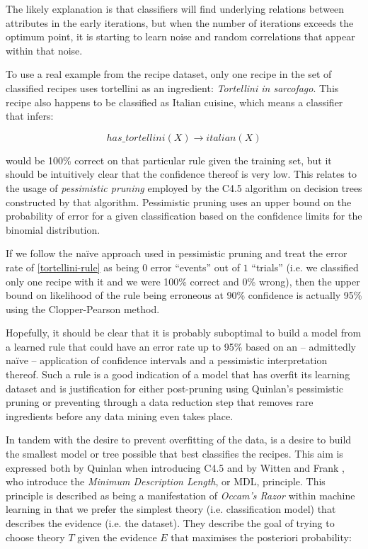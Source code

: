 \documentclass[11pt,a4paper]{article}
\begin{document}
The likely explanation \cite{tetko1995neural} is that classifiers will find underlying
relations between attributes in the early iterations, but when the number of iterations
exceeds the optimum point, it is starting to learn noise and random correlations that
appear within that noise.

To use a real example from the recipe dataset, only one recipe in the set of
classified recipes uses tortellini as an ingredient: \emph{Tortellini in sarcofago}.
This recipe also happens to be classified as Italian cuisine, which means a classifier
that infers:

\begin{equation} \label{tortellini-rule}
has\_tortellini(X) \to italian(X)
\end{equation}

\noindent would be 100\% correct on that particular
rule given the training set, but it should be intuitively clear that the confidence
thereof is very low. This relates to the usage of \emph{pessimistic pruning} employed
by the C4.5 algorithm \cite{quinlan1993c4} on decision trees constructed by that algorithm.
Pessimistic pruning uses an upper bound on the probability of error for a given classification
based on the confidence limits for the binomial distribution.

If we follow the na\"ive approach used in pessimistic pruning and treat the error rate
of \eqref{tortellini-rule} as being $0$ error ``events'' out of $1$ ``trials'' (i.e.
we classified only one recipe with it and we were 100\% correct and 0\% wrong), then
the upper bound on likelihood of the rule being erroneous at 90\% confidence is
actually 95\% using the Clopper-Pearson method. \cite{clopper1934use}

Hopefully, it should be clear that it is probably suboptimal to build a model from
a learned rule that could
have an error rate up to 95\% based on an -- admittedly na\"ive -- application of
confidence intervals and a pessimistic interpretation thereof.
Such a rule is a good indication of a model that has overfit
its learning dataset and is justification for either post-pruning using Quinlan's
pessimistic pruning or preventing through a data reduction step that removes rare
ingredients before any data mining even takes place.

In tandem with the desire to prevent overfitting of the data, is a desire to build
the smallest model or tree possible that best classifies the recipes. This
aim is expressed both by Quinlan when introducing C4.5 \cite{quinlan1993c4}
and by Witten and Frank \cite{witten2011data}, who introduce the
\emph{Minimum Description Length}, or MDL, principle. This principle is
described as being a manifestation of \emph{Occam's Razor} within machine learning
in that we prefer the simplest theory (i.e. classification model) that describes
the evidence (i.e. the dataset). They describe the goal of trying to choose
theory $T$ given the evidence $E$ that maximises the posteriori probability:
\end{document}
